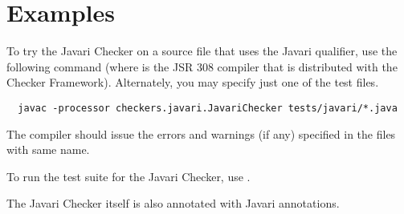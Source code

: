 \section{Examples\label{javari-examples}}

To try the Javari Checker on a source file that uses the Javari
qualifier, use the following command (where  is the JSR 308
compiler  that
is distributed with the Checker Framework).  Alternately, you may
specify just one of the test files.

\begin{Verbatim}
  javac -processor checkers.javari.JavariChecker tests/javari/*.java
\end{Verbatim}

\noindent
The compiler should issue the errors and warnings (if any) specified in the
 files with same name.

To run the test suite for the Javari Checker, use .

The Javari Checker itself is also annotated with Javari annotations.


